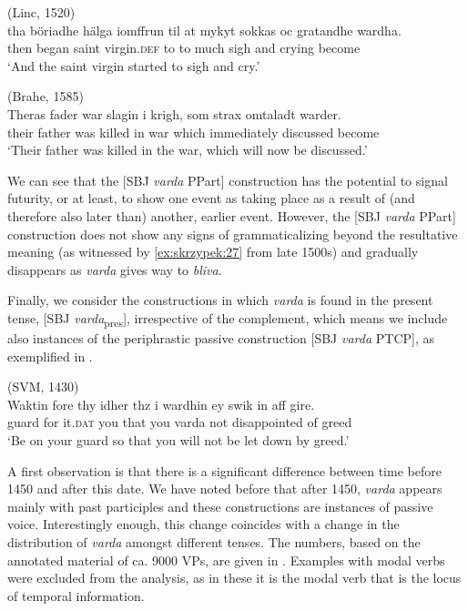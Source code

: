 \documentclass[output=paper,colorlinks,citecolor=brown]{langscibook}
\begin{document}
\ea \label{ex:skrzypek:26}
    (Linc, 1520)\\
    \gll tha böriadhe hälga iomffrun til at mykyt sokkas oc gratandhe wardha.\\
    then began saint virgin.\textsc{def} to to much sigh and crying become\\
    \glt ‘And the saint virgin started to sigh and cry.’
\z

\ea \label{ex:skrzypek:27}
    (Brahe, 1585)\\
    \gll Theras fader war slagin i krigh, som strax omtaladt warder.\\
    their father was killed in war which immediately discussed become\\
    \glt ‘Their father was killed in the war, which will now be discussed.’
\z

We can see that the [SBJ \textit{varda} PPart] construction has the potential to signal futurity, or at least, to show one event as taking place as a result of (and therefore also later than) another, earlier event. However, the [SBJ \textit{varda} PPart] construction does not show any signs of grammaticalizing beyond the resultative meaning (as witnessed by \ref{ex:skrzypek:27} from late 1500s) and gradually disappears as \textit{varda} gives way to \textit{bliva}. 

Finally, we consider the constructions in which \textit{varda} is found in the present tense, [SBJ \textit{varda}\textsubscript{pres}], irrespective of the complement, which means we include also instances of the periphrastic passive construction [SBJ \textit{varda} PTCP], as exemplified in . 


\ea \label{ex:skrzypek:28}
    (SVM, 1430)\\
    \gll Waktin fore thy idher thz i wardhin ey swik
in aff gire.\\
    guard for it.\textsc{dat} you that you varda not disappointed of greed\\
    \glt ‘Be on your guard so that you will not be let down by greed.’
\z

A first observation is that there is a significant difference between time before 1450 and after this date. We have noted before that after 1450, \textit{varda} appears mainly with past participles and these constructions are instances of passive voice. Interestingly enough, this change coincides with a change in the distribution of \textit{varda} amongst different tenses. The numbers, based on the annotated material of ca. 9000 VPs, are given in . Examples with modal verbs were excluded from the analysis, as in these it is the modal verb that is the locus of temporal information.
\end{document}
